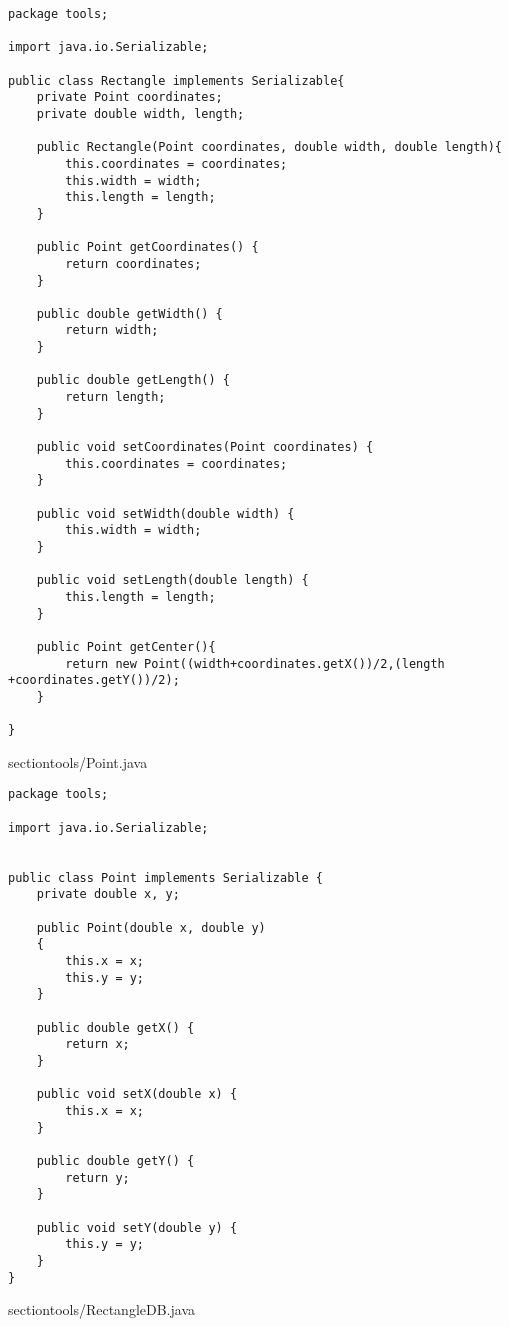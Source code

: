 \documentclass{article}
\begin{document}
\begin{lstlisting}package tools;

import java.io.Serializable;

public class Rectangle implements Serializable{
    private Point coordinates;
    private double width, length;

    public Rectangle(Point coordinates, double width, double length){
        this.coordinates = coordinates;
        this.width = width;
        this.length = length;
    }

    public Point getCoordinates() {
        return coordinates;
    }

    public double getWidth() {
        return width;
    }

    public double getLength() {
        return length;
    }

    public void setCoordinates(Point coordinates) {
        this.coordinates = coordinates;
    }

    public void setWidth(double width) {
        this.width = width;
    }

    public void setLength(double length) {
        this.length = length;
    }

    public Point getCenter(){
        return new Point((width+coordinates.getX())/2,(length +coordinates.getY())/2);
    }

}
\end{lstlisting}
\newpage
section{tools/Point.java}
\begin{lstlisting}package tools;

import java.io.Serializable;


public class Point implements Serializable {
    private double x, y;

    public Point(double x, double y)
    {
        this.x = x;
        this.y = y;
    }

    public double getX() {
        return x;
    }

    public void setX(double x) {
        this.x = x;
    }

    public double getY() {
        return y;
    }

    public void setY(double y) {
        this.y = y;
    }
}
\end{lstlisting}
\newpage
section{tools/RectangleDB.java}
\end{document}

